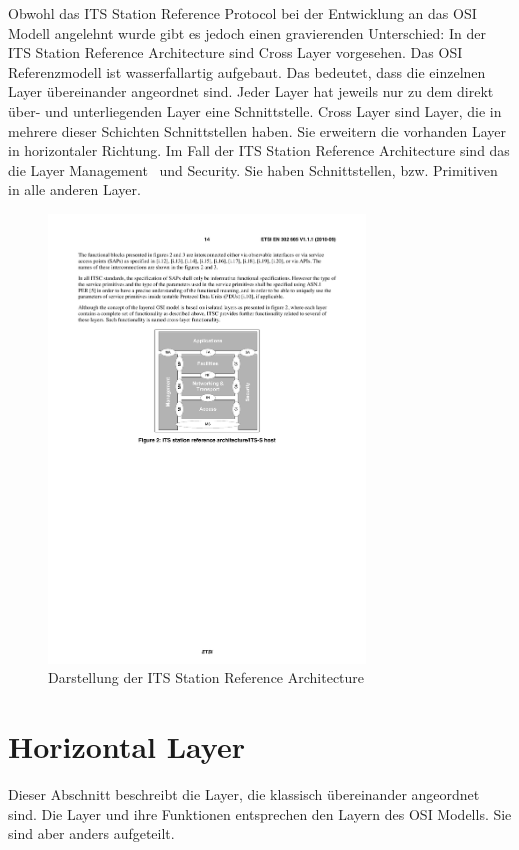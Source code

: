 Obwohl das \ac{ITS} Station Reference Protocol bei der Entwicklung an das \ac{OSI} Modell angelehnt wurde gibt es jedoch einen gravierenden Unterschied: In der \ac{ITS} Station Reference Architecture sind Cross Layer vorgesehen. Das \ac{OSI} Referenzmodell ist wasserfallartig aufgebaut. Das bedeutet, dass die einzelnen Layer übereinander angeordnet sind. Jeder Layer hat jeweils nur zu dem direkt über- und unterliegenden Layer eine Schnittstelle. Cross Layer sind Layer, die in mehrere dieser Schichten Schnittstellen haben. Sie erweitern die vorhanden Layer in horizontaler Richtung. Im Fall der \ac{ITS} Station Reference Architecture sind das die Layer \glqq Management\grqq~ und \glqq Security\grqq. Sie haben Schnittstellen, bzw. Primitiven in alle anderen Layer. 

\begin{figure}
	\includegraphics[width=0.75\textwidth]{content/images/02_architektur/stationReferenceArchitecture.pdf}
	\caption{Darstellung der ITS Station Reference Architecture \cite{etsi2010302}}
	\label{fig:funktionsweise_referenceArchitecture}
\end{figure}

\section{Horizontal Layer}
Dieser Abschnitt beschreibt die Layer, die klassisch übereinander angeordnet sind. Die Layer und ihre Funktionen entsprechen den Layern des \ac{OSI} Modells. Sie sind aber anders aufgeteilt.

